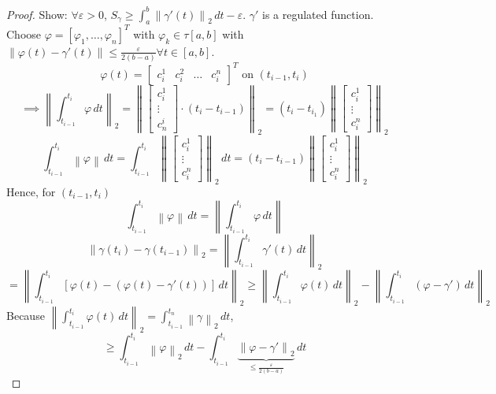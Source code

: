 \documentclass{article}
\newcommand{\norm}[1]{\left\|#1\right\|}
\begin{document}
\begin{proof}
  Show: $\forall \varepsilon > 0$, $S_\gamma \geq \int_a^b \norm{\gamma'(t)}_2 \, dt - \varepsilon$. $\gamma'$ is a regulated function. Choose $\varphi = [\varphi_1, \dots, \varphi_n]^T$ with $\varphi_k \in \tau[a,b]$ with $\norm{\varphi(t) - \gamma'(t)} \leq \frac{\varepsilon}{2(b - a)} \forall t \in [a,b]$.
  \[ \varphi(t) = \begin{bmatrix} c_i^1 & c_i^2 & \dots & c_i^n \end{bmatrix}^T \text{ on } (t_{i-1}, t_i) \]
  \[ \implies \norm{\int_{t_{i-1}}^{t_i} \varphi \, dt}_2 = \norm{\begin{bmatrix} c_i^1 \\ \vdots \\ c_n^i \end{bmatrix} \cdot (t_i - t_{i-1})}_2 = (t_i - t_{i_1}) \norm{\begin{bmatrix} c_i^1 \\ \vdots \\ c_i^n \end{bmatrix}}_2 \]
  \[ \int_{t_{i-1}}^{t_i} \norm{\varphi} \, dt = \int_{t_{i-1}}^{t_i} \norm{\begin{bmatrix} c_i^1 \\ \vdots \\ c_i^n \end{bmatrix}}_2 \, dt = (t_i - t_{i-1}) \norm{\begin{bmatrix} c_i^1 \\ \vdots \\ c_i^n \end{bmatrix}}_2 \]
  Hence, for $(t_{i-1}, t_i)$
  \[ \int_{t_{i-1}}^{t_i} \norm{\varphi} \, dt = \norm{\int_{t_{i-1}}^{t_i} \varphi \, dt} \]
  \[ \norm{\gamma(t_i) - \gamma(t_{i-1})}_2 = \norm{\int_{t_{i-1}}^{t_i} \gamma'(t) \, dt}_2 \]
  \[ = \norm{\int_{t_{i-1}}^{t_i} \left[\varphi(t) - (\varphi(t) - \gamma'(t))\right] \, dt}_2
       \geq \norm{\int_{t_{i-1}}^{t_i} \varphi(t) \, dt}_2 - \norm{\int_{t_{i-1}}^{t_i} (\varphi - \gamma') \, dt}_2 \]
  Because $\norm{\int_{t_{i-1}}^{t_i} \varphi(t) \, dt}_2 = \int_{t_{i-1}}^{t_n} \norm{\gamma}_2 \, dt$,
  \[ \geq \int_{t_{i-1}}^{t_i} \norm{\varphi}_2 \, dt - \int_{t_{i-1}}^{t_i} \underbrace{\norm{\varphi - \gamma'}_2}_{\leq \frac{\varepsilon}{2 (b - a)}} \, dt
\]
\end{proof}
\end{document}
